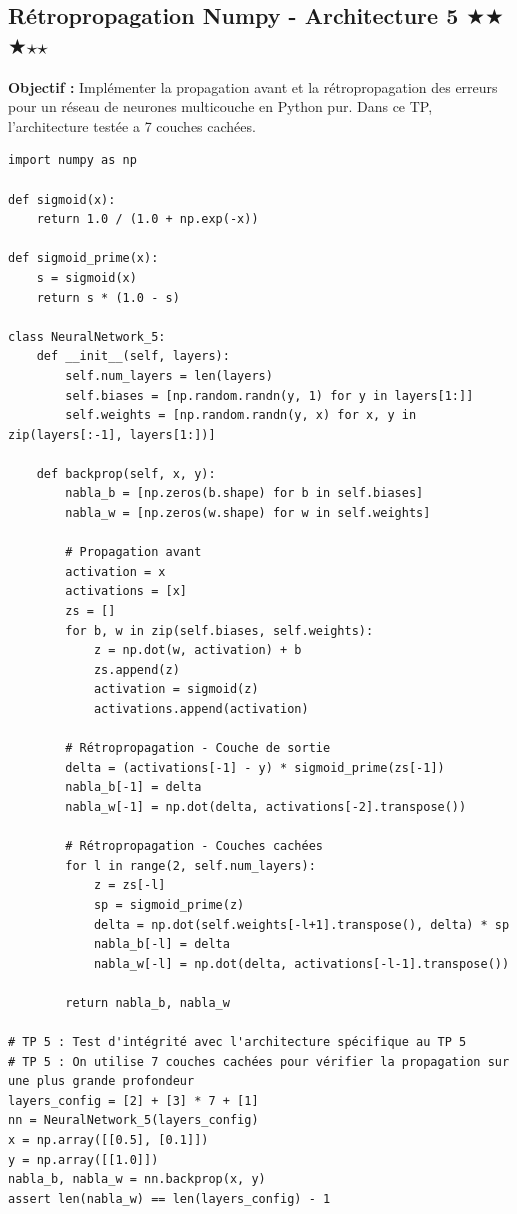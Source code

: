 \documentclass[11pt,a4paper]{article}
\begin{document}
\vspace{1cm}

\subsection*{Rétropropagation Numpy - Architecture 5 $\bigstar$$\bigstar$$\bigstar$$\star$$\star$}

\textbf{Objectif :}
Implémenter la propagation avant et la rétropropagation des erreurs pour un réseau de neurones multicouche en Python pur.
Dans ce TP, l'architecture testée a 7 couches cachées.

\begin{lstlisting}
import numpy as np

def sigmoid(x):
    return 1.0 / (1.0 + np.exp(-x))

def sigmoid_prime(x):
    s = sigmoid(x)
    return s * (1.0 - s)

class NeuralNetwork_5:
    def __init__(self, layers):
        self.num_layers = len(layers)
        self.biases = [np.random.randn(y, 1) for y in layers[1:]]
        self.weights = [np.random.randn(y, x) for x, y in zip(layers[:-1], layers[1:])]

    def backprop(self, x, y):
        nabla_b = [np.zeros(b.shape) for b in self.biases]
        nabla_w = [np.zeros(w.shape) for w in self.weights]

        # Propagation avant
        activation = x
        activations = [x]
        zs = []
        for b, w in zip(self.biases, self.weights):
            z = np.dot(w, activation) + b
            zs.append(z)
            activation = sigmoid(z)
            activations.append(activation)

        # Rétropropagation - Couche de sortie
        delta = (activations[-1] - y) * sigmoid_prime(zs[-1])
        nabla_b[-1] = delta
        nabla_w[-1] = np.dot(delta, activations[-2].transpose())

        # Rétropropagation - Couches cachées
        for l in range(2, self.num_layers):
            z = zs[-l]
            sp = sigmoid_prime(z)
            delta = np.dot(self.weights[-l+1].transpose(), delta) * sp
            nabla_b[-l] = delta
            nabla_w[-l] = np.dot(delta, activations[-l-1].transpose())

        return nabla_b, nabla_w

# TP 5 : Test d'intégrité avec l'architecture spécifique au TP 5
# TP 5 : On utilise 7 couches cachées pour vérifier la propagation sur une plus grande profondeur
layers_config = [2] + [3] * 7 + [1]
nn = NeuralNetwork_5(layers_config)
x = np.array([[0.5], [0.1]])
y = np.array([[1.0]])
nabla_b, nabla_w = nn.backprop(x, y)
assert len(nabla_w) == len(layers_config) - 1
\end{lstlisting}
\end{document}
